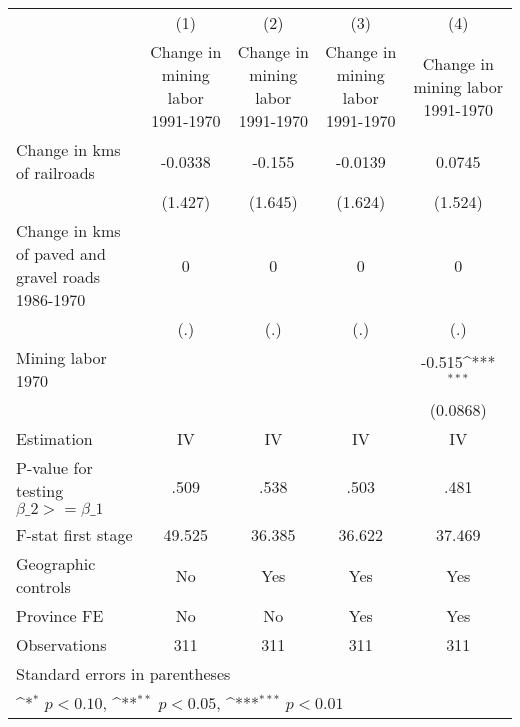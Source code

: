 {
\def\sym#1{\ifmmode^{#1}\else\(^{#1}\)\fi}
\begin{tabular}{l*{4}{c}}
\hline\hline
                &\multicolumn{1}{c}{(1)}&\multicolumn{1}{c}{(2)}&\multicolumn{1}{c}{(3)}&\multicolumn{1}{c}{(4)}\\
                &\multicolumn{1}{c}{Change in mining labor 1991-1970}&\multicolumn{1}{c}{Change in mining labor 1991-1970}&\multicolumn{1}{c}{Change in mining labor 1991-1970}&\multicolumn{1}{c}{Change in mining labor 1991-1970}\\
\hline
Change in kms of railroads&  -0.0338         &   -0.155         &  -0.0139         &   0.0745         \\
                &  (1.427)         &  (1.645)         &  (1.624)         &  (1.524)         \\
[1em]
Change in kms of paved and gravel roads 1986-1970&        0         &        0         &        0         &        0         \\
                &      (.)         &      (.)         &      (.)         &      (.)         \\
[1em]
Mining labor 1970&                  &                  &                  &   -0.515\sym{***}\\
                &                  &                  &                  & (0.0868)         \\
\hline
Estimation      &       IV         &       IV         &       IV         &       IV         \\
P-value for testing $\beta\_2 >= \beta\_1$&     .509         &     .538         &     .503         &     .481         \\
F-stat first stage&   49.525         &   36.385         &   36.622         &   37.469         \\
Geographic controls&       No         &      Yes         &      Yes         &      Yes         \\
Province FE     &       No         &       No         &      Yes         &      Yes         \\
Observations    &      311         &      311         &      311         &      311         \\
\hline\hline
\multicolumn{5}{l}{\footnotesize Standard errors in parentheses}\\
\multicolumn{5}{l}{\footnotesize \sym{*} \(p<0.10\), \sym{**} \(p<0.05\), \sym{***} \(p<0.01\)}\\
\end{tabular}
}
